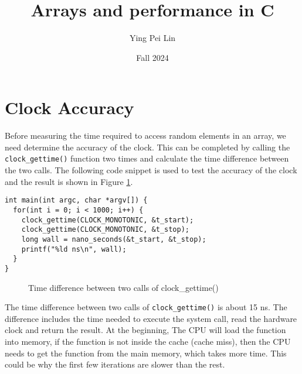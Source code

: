 \documentclass[a4paper,11pt]{article}
\begin{document}
\title{
    \textbf{Arrays and performance in C}
}
\author{Ying Pei Lin}
\date{Fall 2024}

\maketitle

\section*{Clock Accuracy}

Before measuring the time required to access random elements in an array, we need determine the 
accuracy of the clock. This can be completed by calling the {\tt clock\_gettime()} function two times and 
calculate the time difference between the two calls. The following code snippet is used to test the accuracy 
of the clock and the result is shown in Figure \ref{fig:clock_accuracy}. 

\begin{verbatim}
int main(int argc, char *argv[]) {
  for(int i = 0; i < 1000; i++) {
    clock_gettime(CLOCK_MONOTONIC, &t_start);
    clock_gettime(CLOCK_MONOTONIC, &t_stop);
    long wall = nano_seconds(&t_start, &t_stop);
    printf("%ld ns\n", wall); 
  }
}
\end{verbatim}

\begin{figure}[H]
  \centering
  \caption{Time difference between two calls of clock\_gettime()}
  \label{fig:clock_accuracy}
\end{figure}

The time difference between two calls of {\tt clock\_gettime()} is about 15 ns. The difference
includes the time needed to execute the system call, read the hardware clock and return the result. 
At the beginning, The CPU will load the function into memory, if the function 
is not inside the cache (cache miss), then the CPU needs to get the function from the main memory, 
which takes more time. This could be why the first few iterations are slower than the rest.
\end{document}
